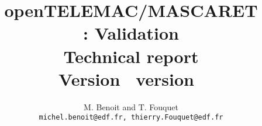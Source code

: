 \title{\textbf{openTELEMAC/MASCARET \\
\tomawac : Validation \\
Technical report \\
Version  \ version~\rel}}
\author{M. Benoit and T. Fouquet  \\
   \texttt{michel.benoit@edf.fr, thierry.Fouquet@edf.fr}}

\date{}
 
\maketitle
